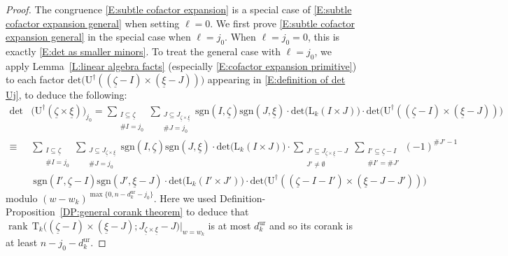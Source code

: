 \documentclass[12pt]{amsart}
\theoremstyle{definition}
\numberwithin{equation}{subsection}
\def\rmL{\mathrm{L}}
\def\rmU{\mathrm{U}}
\def\rmT{\mathrm{T}}
\DeclareMathOperator{\rank}{rank}
\renewcommand{\det}{\mathrm{det}}
\newcommand{\sgn}{\mathrm{sgn}}
\newcommand{\ur}{\mathrm{ur}}
\begin{document}
\begin{proof}
The congruence \eqref{E:subtle cofactor expansion} is a special case of \eqref{E:subtle cofactor expansion general} when setting $\ell=0$.
We first prove \eqref{E:subtle cofactor expansion general} in the special case when $\ell=j_0$. When $\ell=j_0 =0$, this is exactly \eqref{E:det as smaller minors}.
To treat the general case with $\ell =j_0$, we apply Lemma~\ref{L:linear algebra facts} (especially \eqref{E:cofactor expansion primitive}) to  each factor $\det\big(\rmU^\dagger((\underline \zeta-I) \times (\underline \xi -J))\big)$ appearing in \eqref{E:definition of det Uj}, to deduce the following:
\begin{align*}
\det&\big( \rmU^\dagger(\underline \zeta \times \underline \xi)\big)_{j_0}= \sum_{\substack{I \subseteq \underline \zeta\\ \#I = j_0}} \sum_{\substack{J \subseteq J_{\underline \zeta \times \underline \xi}\\ \#J = j_0}} \sgn(I, \underline \zeta) \sgn(J, \underline \xi) \cdot \det\big(\rmL_k(I \times J)\big) \cdot \det \big( \rmU^\dagger((\underline \zeta-I) \times (\underline \xi-J))\big)
\\
\equiv \ & \sum_{\substack{I \subseteq \underline \zeta\\ \#I = j_0}} \sum_{\substack{J \subseteq J_{\underline \zeta \times \underline \xi}\\ \#J = j_0}} \sgn(I, \underline \zeta) \sgn(J, \underline \xi) \cdot \det\big(\rmL_k(I \times J)\big) \cdot \sum_{\substack{J' \subseteq J_{\underline \zeta \times \underline \xi} - J\\ J' \neq \emptyset}}
\sum_{\substack{I' \subseteq \underline \zeta - I\\ \#I' =\#J'}}(-1)^{\#J'-1}\\
&\ \sgn(I', \underline \zeta-I) \sgn(J', \underline \xi-J) \cdot \det\big(\rmL_k(I' \times J')\big) \cdot \det \big( \rmU^\dagger((\underline \zeta-I-I') \times (\underline \xi-J-J'))\big)
\end{align*}
modulo $(w-w_k)^{\max\{0, n-d_k^\ur-j_0\}}$.  Here we used 
Definition-Proposition~\ref{DP:general corank theorem} to deduce that $\rank\, 
\rmT_k \big( (\underline \zeta - I) \times (\underline \xi-J); J_{\underline \zeta \times  \underline \xi} - 
J\big)|_{w=w_k}$ is at most $d_k^\ur$ and so its corank is at least 
$n-j_0-d_k^\ur$.



\end{proof}
\end{document}
